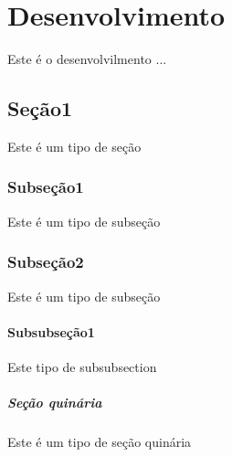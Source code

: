\chapter{Desenvolvimento}

Este é o desenvolvilmento ...

\section{Seção1}
Este é um tipo de seção

\subsection{Subseção1}
Este é um tipo de subseção

\subsection{Subseção2}
Este é um tipo de subseção

\subsubsection{Subsubseção1}
Este tipo de subsubsection

\paragraph{Seção quinária}
Este é um tipo de seção quinária

